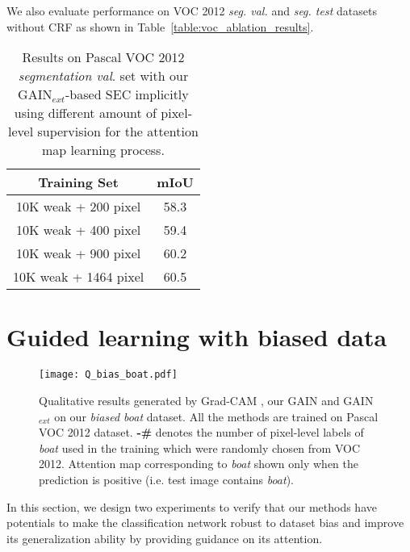 \documentclass[10pt,twocolumn,letterpaper]{article}
\begin{document}
We also evaluate performance on VOC 2012 \textit{seg. val.} and \textit{seg. test} datasets without CRF as shown in Table~\ref{table:voc_ablation_results}. 




\begin{table}
\begin{center}
\begin{tabular}{cc}
\hline
Training Set & mIoU \\
\hline\hline
 10K weak + 200 pixel & 58.3\\
 10K weak + 400 pixel & 59.4\\
 10K weak + 900 pixel & 60.2\\
 10K weak + 1464 pixel & 60.5\\
\hline
\end{tabular}
\end{center}
\caption{Results on Pascal VOC 2012 \emph{segmentation val}. set with our GAIN$_{ext}$-based SEC implicitly using different amount of pixel-level supervision for the attention map learning process.}
\label{table:voc_val_different_percent_supervision}
\end{table}





\section{Guided learning with biased data}\label{section:human_guided_classification_experiment}


\begin{figure*}%
\centering
\texttt{[image: Q\_bias\_boat.pdf]} %
\caption{Qualitative results generated by Grad-CAM \cite{grad-cam}, our GAIN and GAIN$_{ext}$ on our \emph{biased boat} dataset. All the methods are trained on Pascal VOC 2012 dataset. \textbf{-\# } denotes the number of pixel-level labels of \emph{boat} used in the training which were randomly chosen from VOC 2012. Attention map corresponding to \emph{boat} shown only when the prediction is positive (i.e. test image contains \emph{boat}).}
\label{fig:Q_result_bias_boat} 
\end{figure*} 

In this section, we design two experiments to verify that our methods have potentials to make the classification network robust to dataset bias and improve its generalization ability by providing guidance on its attention. 
\end{document}
